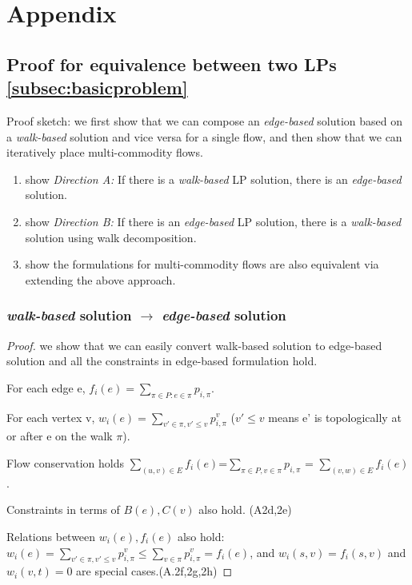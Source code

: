 \appendix
\section{Appendix}
\subsection{Proof for equivalence between two LPs \autoref{subsec:basicproblem}} \label{subsec:lppaths}
Proof sketch: we first show that we can compose an \emph{edge-based} solution based on a \emph{walk-based} solution and vice versa for a single flow, and then show that we can iteratively place multi-commodity flows. 
\begin{enumerate}
\item show \emph{Direction A:} If there is a \emph{walk-based} LP solution, there is an \emph{edge-based} solution.
\item show \emph{Direction B:} If there is an \emph{edge-based} LP solution, there is a \emph{walk-based} solution using walk decomposition.
\item show the formulations for multi-commodity flows are also equivalent via extending the above approach.
\end{enumerate}

\subsubsection{\emph{walk-based} solution $\rightarrow$ \emph{edge-based} solution}
\begin{proof}
we show that we can easily convert walk-based solution to edge-based solution and all the constraints in edge-based formulation hold.

For each edge e, $f_i(e) =\sum\limits_{\pi\in P: e\in \pi} p_{i,\pi}$.

For each vertex v, $w_i(e) =  \sum\limits_{v'\in \pi, v' \leq v} p_{i,\pi}^v$ ($v'\leq v$ means e' is topologically at or after e on the walk $\pi$). 

Flow conservation holds $ \sum\limits_{(u,v)\in E} f_i(e) $=$ \sum\limits_{\pi\in P, v\in \pi} p_{i, \pi}$ = $\sum\limits_{(v,w )\in E} f_i(e)$. 

Constraints in terms of $B(e), C(v)$ also hold. (A2d,2e)

Relations between $w_i(e), f_i(e)$ also hold: $w_i(e)=  \sum\limits_{v'\in \pi, v' \leq v} p_{i,\pi}^v \leq \sum \limits_{v\in \pi} p_{i,\pi}^v = f_i(e) $, and $w_i(s,v)=f_i(s,v)$ and $w_i(v,t)=0$ are special cases.(A.2f,2g,2h)

\end{proof}

